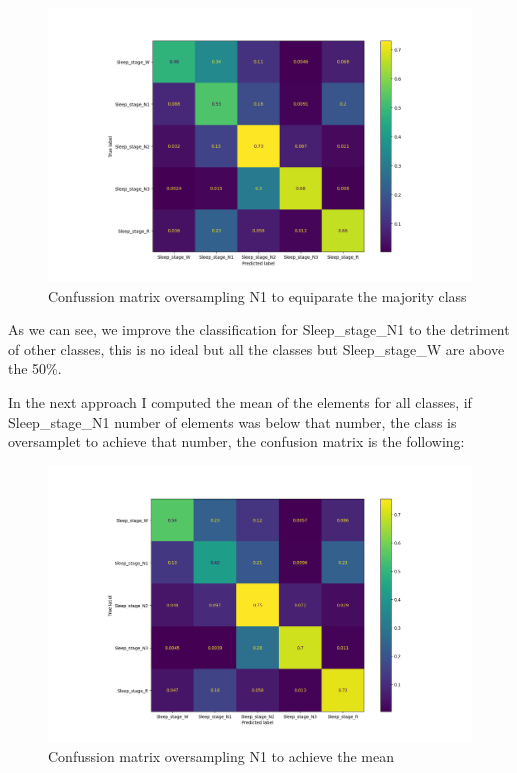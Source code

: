 \begin{figure}[H]
\centering
\includegraphics[scale=.5]{figs/cm-da-max.png}
\caption{Confussion matrix oversampling N1 to equiparate the majority class}
\label{fig5}
\end{figure}

As we can see, we improve the classification for Sleep\_stage\_N1 to the detriment of other classes, this is no ideal but all the classes but Sleep\_stage\_W are above the 50\%.

\newpage
In the next approach I computed the mean of the elements for all classes, if Sleep\_stage\_N1 number of elements was below that number, the class is oversamplet to achieve that number, the confusion matrix is the following:

\begin{figure}[H]
\centering
\includegraphics[scale=.5]{figs/cm-da-mean.png}
\caption{Confussion matrix oversampling N1 to achieve the mean}
\label{fig6}
\end{figure}

